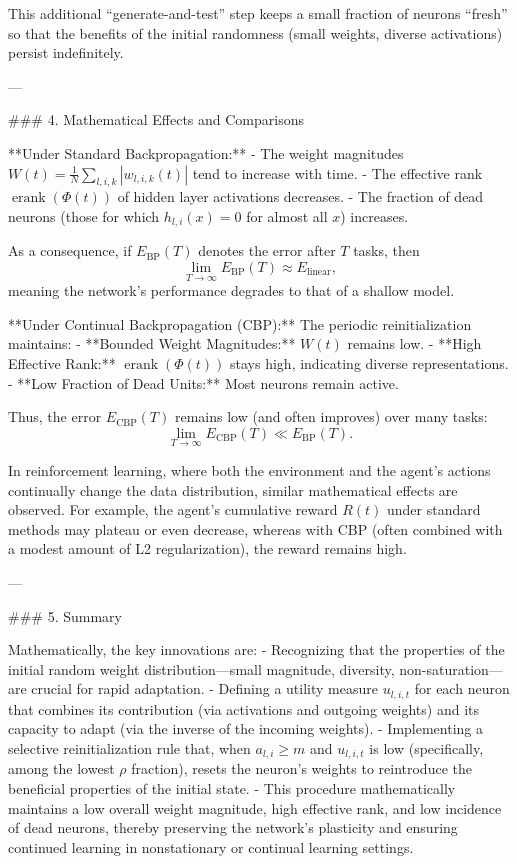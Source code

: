 This additional “generate-and-test” step keeps a small fraction of neurons “fresh” so that the benefits of the initial randomness (small weights, diverse activations) persist indefinitely.

---

### 4. Mathematical Effects and Comparisons

**Under Standard Backpropagation:**  
- The weight magnitudes $W(t) = \frac{1}{N}\sum_{l,i,k} |w_{l,i,k}(t)|$ tend to increase with time.
- The effective rank $\operatorname{erank}(\Phi(t))$ of hidden layer activations decreases.
- The fraction of dead neurons (those for which $h_{l,i}(x)=0$ for almost all $x$) increases.

As a consequence, if $E_{\text{BP}}(T)$ denotes the error after $T$ tasks, then
$$
\lim_{T\to\infty} E_{\text{BP}}(T) \approx E_{\text{linear}},
$$
meaning the network’s performance degrades to that of a shallow model.

**Under Continual Backpropagation (CBP):**  
The periodic reinitialization maintains:
- **Bounded Weight Magnitudes:** $W(t)$ remains low.
- **High Effective Rank:** $\operatorname{erank}(\Phi(t))$ stays high, indicating diverse representations.
- **Low Fraction of Dead Units:** Most neurons remain active.
  
Thus, the error $E_{\text{CBP}}(T)$ remains low (and often improves) over many tasks:
$$
\lim_{T\to\infty} E_{\text{CBP}}(T) \ll E_{\text{BP}}(T).
$$

In reinforcement learning, where both the environment and the agent’s actions continually change the data distribution, similar mathematical effects are observed. For example, the agent’s cumulative reward $R(t)$ under standard methods may plateau or even decrease, whereas with CBP (often combined with a modest amount of L2 regularization), the reward remains high.

---

### 5. Summary

Mathematically, the key innovations are:
- Recognizing that the properties of the initial random weight distribution—small magnitude, diversity, non-saturation—are crucial for rapid adaptation.
- Defining a utility measure $u_{l,i,t}$ for each neuron that combines its contribution (via activations and outgoing weights) and its capacity to adapt (via the inverse of the incoming weights).
- Implementing a selective reinitialization rule that, when $a_{l,i} \ge m$ and $u_{l,i,t}$ is low (specifically, among the lowest $\rho$ fraction), resets the neuron's weights to reintroduce the beneficial properties of the initial state.
- This procedure mathematically maintains a low overall weight magnitude, high effective rank, and low incidence of dead neurons, thereby preserving the network’s plasticity and ensuring continued learning in nonstationary or continual learning settings.


